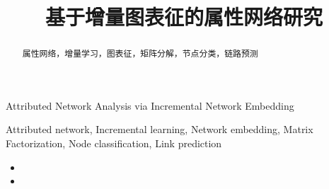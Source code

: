 \documentclass{sysuthesis} %
\numberwithin{algorithm}{chapter}
\theoremstyle{plain}
\theoremstyle{definition}
\theoremstyle{definition}
\begin{document}
\title{基于增量图表征的属性网络研究}{}{Attributed Network Analysis via Incremental Network Embedding}{}

\author{}{}
\advisor{}{}{}{}
\major{}{}
\school{}




\maketitle

\begin{abstract}{属性网络，增量学习，图表征，矩阵分解，节点分类，链路预测}
  
\end{abstract}

\begin{englishabstract}{Attributed network, Incremental learning, Network embedding, Matrix Factorization, Node classification, Link prediction}
  
\end{englishabstract}

\tableofcontents


\begin{Main} %










%

%

\end{Main} %






\newpage
\printindex %

\begin{Resume}
\begin{itemize}
\item %
\item %


\end{itemize}
\end{Resume}





\begin{Acknowledgement}


\vspace{6pt}


\end{Acknowledgement}
\end{document}
